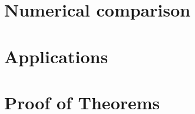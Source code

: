 \documentclass{sig-alternate}
\begin{document}



\section{Numerical comparison}
\label{sec:comparison}

\section{Applications}
\label{sec:haha}



\appendix{}

\section{Proof of Theorems}
\label{sec:proof}
\end{document}
